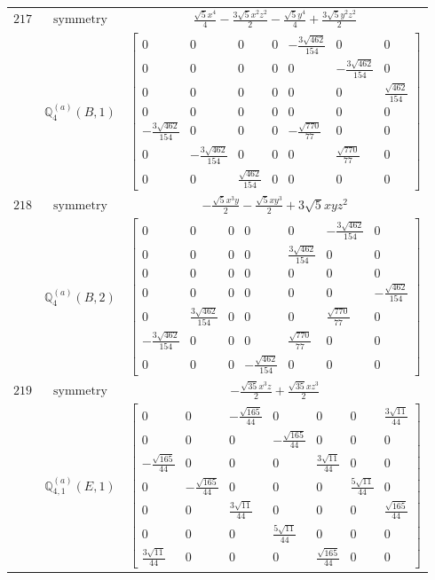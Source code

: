 \documentclass[fleqn,8pt,landscape]{jsarticle}
\begin{document}
\begin{longtable}{ccc}
$ 217 $ & $ \text{symmetry} $ & $ \frac{\sqrt{5} x^{4}}{4} - \frac{3 \sqrt{5} x^{2} z^{2}}{2} - \frac{\sqrt{5} y^{4}}{4} + \frac{3 \sqrt{5} y^{2} z^{2}}{2} $ \\
$  $ & $ \mathbb{Q}_{4}^{(a)}(B,1) $ & $ \begin{bmatrix} 0 & 0 & 0 & 0 & - \frac{3 \sqrt{462}}{154} & 0 & 0 \\ 0 & 0 & 0 & 0 & 0 & - \frac{3 \sqrt{462}}{154} & 0 \\ 0 & 0 & 0 & 0 & 0 & 0 & \frac{\sqrt{462}}{154} \\ 0 & 0 & 0 & 0 & 0 & 0 & 0 \\ - \frac{3 \sqrt{462}}{154} & 0 & 0 & 0 & - \frac{\sqrt{770}}{77} & 0 & 0 \\ 0 & - \frac{3 \sqrt{462}}{154} & 0 & 0 & 0 & \frac{\sqrt{770}}{77} & 0 \\ 0 & 0 & \frac{\sqrt{462}}{154} & 0 & 0 & 0 & 0 \end{bmatrix} $ \\ \hline
$ 218 $ & $ \text{symmetry} $ & $ - \frac{\sqrt{5} x^{3} y}{2} - \frac{\sqrt{5} x y^{3}}{2} + 3 \sqrt{5} x y z^{2} $ \\
$  $ & $ \mathbb{Q}_{4}^{(a)}(B,2) $ & $ \begin{bmatrix} 0 & 0 & 0 & 0 & 0 & - \frac{3 \sqrt{462}}{154} & 0 \\ 0 & 0 & 0 & 0 & \frac{3 \sqrt{462}}{154} & 0 & 0 \\ 0 & 0 & 0 & 0 & 0 & 0 & 0 \\ 0 & 0 & 0 & 0 & 0 & 0 & - \frac{\sqrt{462}}{154} \\ 0 & \frac{3 \sqrt{462}}{154} & 0 & 0 & 0 & \frac{\sqrt{770}}{77} & 0 \\ - \frac{3 \sqrt{462}}{154} & 0 & 0 & 0 & \frac{\sqrt{770}}{77} & 0 & 0 \\ 0 & 0 & 0 & - \frac{\sqrt{462}}{154} & 0 & 0 & 0 \end{bmatrix} $ \\ \hline
$ 219 $ & $ \text{symmetry} $ & $ - \frac{\sqrt{35} x^{3} z}{2} + \frac{\sqrt{35} x z^{3}}{2} $ \\
$  $ & $ \mathbb{Q}_{4,1}^{(a)}(E,1) $ & $ \begin{bmatrix} 0 & 0 & - \frac{\sqrt{165}}{44} & 0 & 0 & 0 & \frac{3 \sqrt{11}}{44} \\ 0 & 0 & 0 & - \frac{\sqrt{165}}{44} & 0 & 0 & 0 \\ - \frac{\sqrt{165}}{44} & 0 & 0 & 0 & \frac{3 \sqrt{11}}{44} & 0 & 0 \\ 0 & - \frac{\sqrt{165}}{44} & 0 & 0 & 0 & \frac{5 \sqrt{11}}{44} & 0 \\ 0 & 0 & \frac{3 \sqrt{11}}{44} & 0 & 0 & 0 & \frac{\sqrt{165}}{44} \\ 0 & 0 & 0 & \frac{5 \sqrt{11}}{44} & 0 & 0 & 0 \\ \frac{3 \sqrt{11}}{44} & 0 & 0 & 0 & \frac{\sqrt{165}}{44} & 0 & 0 \end{bmatrix} $ \\ \hline

\end{longtable}
\end{document}
